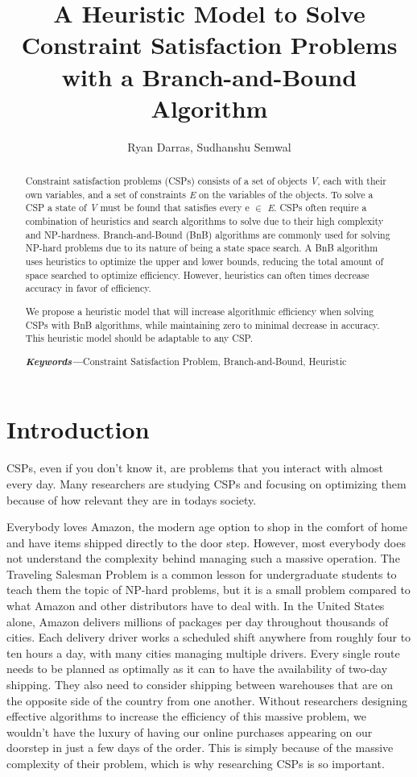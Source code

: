 \documentclass[10pt,twoside]{IEEEtran}
\title{A Heuristic Model to Solve Constraint Satisfaction Problems with a Branch-and-Bound Algorithm}
\author{Ryan Darras, Sudhanshu Semwal}
\providecommand{\keywords}[1]{\textbf{\textit{Keywords---}}#1}
\begin{document}
\maketitle

\begin{abstract}
Constraint satisfaction problems (CSPs) consists of a set of objects \emph{V}, each with their own variables, and a set of constraints \emph{E} on the variables of the objects. To solve a CSP a state of \emph{V} must be found that satisfies every e ${\in }$ \emph{E}. CSPs often require a combination of heuristics and search algorithms to solve due to their high complexity and NP-hardness. Branch-and-Bound (BnB) algorithms are commonly used for solving NP-hard problems due to its nature of being a state space search. A BnB algorithm uses heuristics to optimize the upper and lower bounds, reducing the total amount of space searched to optimize efficiency. However, heuristics can often times decrease accuracy in favor of efficiency.

We propose a heuristic model that will increase algorithmic efficiency when solving CSPs with BnB algorithms, while maintaining zero to minimal decrease in accuracy. This heuristic model should be adaptable to any CSP.

\vspace{5mm}
\noindent \keywords{Constraint Satisfaction Problem, Branch-and-Bound, Heuristic}
\end{abstract}

\section{Introduction}
CSPs, even if you don't know it, are problems that you interact with almost every day. Many researchers are studying CSPs and focusing on optimizing them because of how relevant they are in todays society. 

Everybody loves Amazon, the modern age option to shop in the comfort of home and have items shipped directly to the door step. However, most everybody does not understand the complexity behind managing such a massive operation. The Traveling Salesman Problem is a common lesson for undergraduate students to teach them the topic of NP-hard problems, but it is a small problem compared to what Amazon and other distributors have to deal with. In the United States alone, Amazon delivers millions of packages per day throughout thousands of cities. Each delivery driver works a scheduled shift anywhere from roughly four to ten hours a day, with many cities managing multiple drivers. Every single route needs to be planned as optimally as it can to have the availability of two-day shipping. They also need to consider shipping between warehouses that are on the opposite side of the country from one another. Without researchers designing effective algorithms to increase the efficiency of this massive problem, we wouldn't have the luxury of having our online purchases appearing on our doorstep in just a few days of the order. This is simply because of the massive complexity of their problem, which is why researching CSPs is so important.
\end{document}
